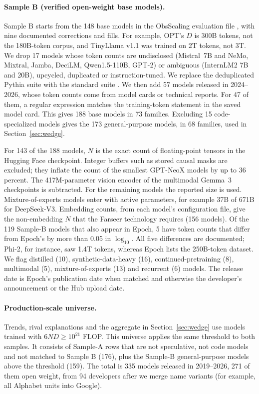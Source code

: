 \paragraph{Sample B (verified open-weight base models).}
Sample B starts from the 148 base models in the ObsScaling evaluation file \citep{ruan2024observational}, with nine
documented corrections and fills. For example, OPT's $D$ is 300B tokens, not the 180B-token corpus, and TinyLlama v1.1 was
trained on 2T tokens, not 3T. We drop 17 models whose token counts are undisclosed (Mistral~7B and NeMo, Mixtral,
Jamba, DeciLM, Qwen1.5-110B, GPT-2) or ambiguous (InternLM2 7B and 20B), upcycled, duplicated or instruction-tuned.
We replace the deduplicated Pythia suite with the standard suite \citep{biderman2023pythia}. We then add 57 models
released in 2024--2026, whose token counts come from model cards or technical reports. For 47 of them, a regular
expression matches the training-token statement in the saved model card. This gives 188 base models in 73 families.
Excluding 15 code-specialized models gives the 173 general-purpose models, in 68 families, used in
Section~\ref{sec:wedge}.

For 143 of the 188 models, $N$ is the exact count of floating-point tensors in the Hugging Face checkpoint. Integer
buffers such as stored causal masks are excluded; they inflate the count of the smallest GPT-NeoX models by up to 36
percent. The 417M-parameter vision encoder of the multimodal Gemma~3 checkpoints is subtracted. For the remaining
models the reported size is used. Mixture-of-experts models enter with active parameters, for example 37B of 671B for
DeepSeek-V3. Embedding counts, from each model's configuration file, give the non-embedding $N$ that the Farseer
technology requires (156 models). Of the 119 Sample-B models that also appear in Epoch, 5 have token counts that
differ from Epoch's by more than 0.05 in $\log_{10}$. All five differences are documented; Phi-2, for instance, saw
1.4T tokens, whereas Epoch lists the 250B-token dataset. We flag distilled (10), synthetic-data-heavy (16),
continued-pretraining (8), multimodal (5), mixture-of-experts (13) and recurrent (6) models. The release date is
Epoch's publication date when matched and otherwise the developer's announcement or the Hub upload date.

\paragraph{Production-scale universe.}
Trends, rival explanations and the aggregate in Section~\ref{sec:wedge} use models trained with $6ND\ge10^{21}$ FLOP.
This universe applies the same threshold to both samples. It consists of Sample-A rows that are not speculative, not
code models and not matched to Sample B (176), plus the Sample-B general-purpose models above the threshold (159). The
total is 335 models released in 2019--2026, 271 of them open weight, from 94 developers after we merge name variants
(for example, all Alphabet units into Google).

